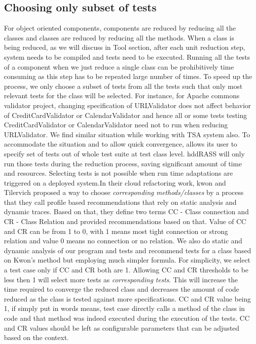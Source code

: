 \subsection{Choosing only subset of tests}
For object oriented components, components are reduced by reducing all the classes and classes are reduced by reducing all the methods. When a class is being reduced, as we will discuss in Tool section, after each unit reduction step, system needs to be compiled and tests need to be executed. Running all the tests of a component when we just reduce a single class can be prohibitively time consuming as this step has to be repeated large number of times. To speed up the process, we only choose a subset of tests from all the tests such that only most relevant tests for the class will be selected. For instance, for Apache commons validator project, changing specification of URLValidator does not affect behavior of CreditCardValidator or CalendarValidator and hence all or some tests testing CreditCardValidator or CalendarValidator need not to run when reducing URLValidator. We find similar situation while working with TSA system also. To accommodate the situation and to allow quick convergence, \mytool allows its user to specify set of tests out of whole test suite at test class level. hddRASS will only run those tests during the reduction process, saving significant amount of time and resources. Selecting tests is not possible when run time adaptations are triggered on a deployed system.In their cloud refactoring work, kwon and Tilervich proposed a way to choose \emph{corresponding methods/classes}  by a process that they call profile based recommendations that rely on static analysis and dynamic traces. Based on that, they define two terms CC - Class connection and CR - Class Relation and provided recommendations based on that. Value of CC and CR can be from 1 to 0, with 1 means most tight connection or strong relation and value 0 means no connection or no relation. We also do static and dynamic analysis of our program and tests and recommend tests for a class based on Kwon's method but employing much simpler formula. For simplicity, we select a test case only if CC and CR both are 1. Allowing CC and CR thresholds to be less then 1 will select more tests as \emph{corresponding tests}. This will increase the time required to converge the reduced class and decreases the amount of code reduced as the class is tested against more specifications. CC and CR value being 1, if simply put in words means, test case directly calls a method of the class in code and that method was indeed executed during the execution of the tests. CC and CR values should be left as configurable parameters that can be adjusted based on the context.      
